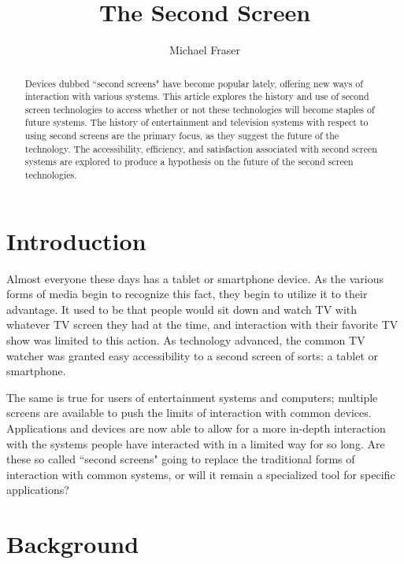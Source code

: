 \documentclass[11pt, oneside]{article}
\begin{document}
\title{The Second Screen}
\author{Michael Fraser}
\maketitle

\begin{abstract}
Devices dubbed ``second screens" have become popular lately, offering new ways of interaction with various systems. This article explores the history and use of second screen technologies to access whether or not these technologies will become staples of future systems. The history of entertainment and television systems with respect to using second screens are the primary focus, as they suggest the future of the technology. The accessibility, efficiency, and satisfaction associated with second screen systems are explored to produce a hypothesis on the future of the second screen technologies.
\end{abstract}

\tableofcontents

\section{Introduction}
Almost everyone these days has a tablet or smartphone device. As the various forms of media begin to recognize this fact, they begin to utilize it to their advantage. It used to be that people would sit down and watch TV with whatever TV screen they had at the time, and interaction with their favorite TV show was limited to this action. As technology advanced, the common TV watcher was granted easy accessibility to a second screen of sorts: a tablet or smartphone. 

The same is true for users of entertainment systems and computers; multiple screens are available to push the limits of interaction with common devices. Applications and devices are now able to allow for a more in-depth interaction with the systems people have interacted with in a limited way for so long. Are these so called ``second screens" going to replace the traditional forms of interaction with common systems, or will it remain a specialized tool for specific applications?

\section{Background}
\end{document}
